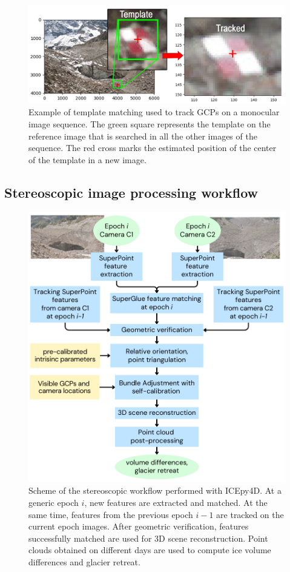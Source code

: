 \begin{figure}
    \centering
    \includegraphics[width=1\textwidth]{tracking_gcp.png}
    \caption{Example of template matching used to track GCPs on a
        monocular image sequence. The green square represents the
        template on the reference image that is searched in all the other
        images of the sequence.
        The red cross marks the estimated position of the center of the
        template in a new
        image.}
    \label{fig:4:templatematch}
\end{figure}

\subsection{Stereoscopic image processing workflow}\label{sec:4:stereoworkflow}

\begin{figure}
  \centering
  \includegraphics[width=.8\textwidth]{3_stereo-workflow.png}
  \caption{Scheme of the stereoscopic workflow performed with ICEpy4D. At a generic epoch \(i\), new features are extracted and matched. At the same time, features from the previous epoch \(i-1\) are tracked on the current epoch images. After geometric verification, features successfully matched are used for 3D scene reconstruction. Point clouds obtained on different days are used to compute ice volume differences and glacier retreat.}
  \label{fig:4:stereo-workflow}
\end{figure}

